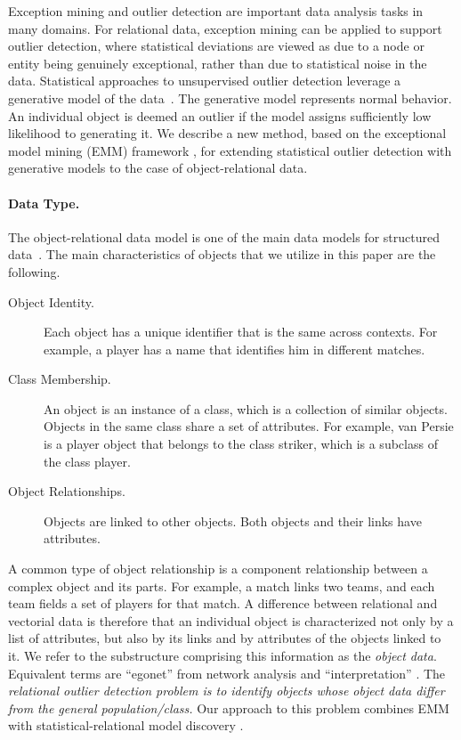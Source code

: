 {Exception mining and outlier detection are important data analysis tasks in many domains. For relational data, exception mining can be applied to support outlier detection, where statistical deviations are viewed as due to a node or entity being genuinely exceptional, rather than due to statistical noise in the data. Statistical approaches to unsupervised outlier detection leverage a generative model of the data~\citet{aggarwal2013}. The generative model represents normal behavior. An individual object is deemed an outlier if  the model assigns sufficiently low likelihood to generating it. 
We describe a new method, based on the exceptional model mining (EMM) framework \citep{Duivesteijn2016}, for extending statistical  outlier detection with generative models to the case of object-relational data. 


\paragraph{Data Type.} The object-relational data model is one of the main data models for structured data~\citep{Koller1997}. The main 
characteristics of objects that we utilize in this paper are the following. 

\begin{description}
\item[Object Identity.] Each object has a unique identifier that is the same across contexts. For example, a player has a name that identifies him in different matches. 
\item[Class Membership.] An object is an instance of a class, which is a collection of similar objects. Objects in the same class share a set of attributes. For example, van Persie is a player object that belongs to the class striker, which is a subclass of the  class player.
\item[Object Relationships.] Objects are linked  to other objects. Both objects and their links have attributes. 
\end{description}


A common type of object relationship is a component relationship between a complex object and its parts.
For example, a match links two teams, and each team fields a set of players for that match. A difference between relational and vectorial data is therefore that an individual object is characterized not only by a list of attributes, but also by its links and by attributes of the objects linked to it. We refer to the substructure comprising this information as the {\em object data}. Equivalent terms are ``egonet'' from network analysis \citep{Akoglu2015} and ``interpretation'' \citep{Maervoet2012}. The {\em relational outlier detection problem is to identify objects whose object data differ from the general population/class.} Our approach to this problem combines EMM with statistical-relational model discovery \citep{SRL2007}.

}
